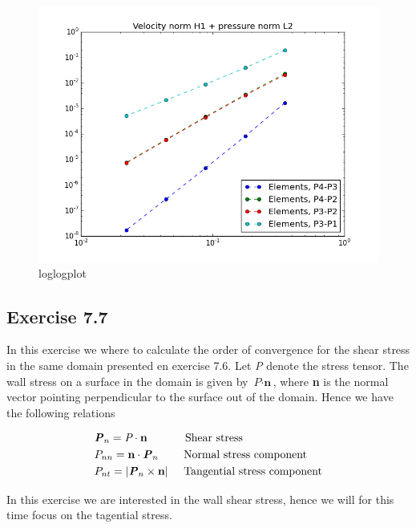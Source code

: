 \documentclass[a4paper,norsk]{article}
\begin{document}
\begin{figure}[h!]
	\centering
	\caption*{loglogplot}
	\includegraphics[scale=0.4]{comb.png}
\end{figure}

\newpage
\subsection{Exercise 7.7}
In this exercise we where to calculate the order of convergence for the shear stress in the same domain presented en exercise 7.6.
Let \textit{P} denote the stress tensor. The wall stress on a surface in the domain is given by $\textit{P} \cdot \textbf{n}$, where \textbf{n} is the normal vector 
pointing perpendicular to the surface out of the domain. Hence we have the following relations

\begin{align*}
 &\textbf{\textit{P}}_n = \textit{P} \cdot \textbf{n} \hspace{12mm} \text{Shear stress} \\
	&P_{nn} = \textbf{n} \cdot \textbf{\textit{P}}_n \hspace{8mm} \text{Normal stress component} \\
	&P_{nt} = |\textbf{\textit{P}}_n \times \textbf{n}| \hspace{5mm} \text{Tangential stress component}
	\end{align*}
	
In this exercise we are interested in the wall shear stress, hence we will for this time focus on the tagential stress.
\end{document}
